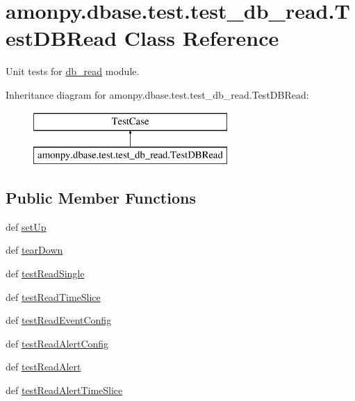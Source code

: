 \hypertarget{classamonpy_1_1dbase_1_1test_1_1test__db__read_1_1_test_d_b_read}{\section{amonpy.\-dbase.\-test.\-test\-\_\-db\-\_\-read.\-Test\-D\-B\-Read Class Reference}
\label{classamonpy_1_1dbase_1_1test_1_1test__db__read_1_1_test_d_b_read}
}


Unit tests for \hyperlink{namespaceamonpy_1_1dbase_1_1db__read}{db\-\_\-read} module.  


Inheritance diagram for amonpy.\-dbase.\-test.\-test\-\_\-db\-\_\-read.\-Test\-D\-B\-Read\-:\begin{figure}[H]
\begin{center}
\leavevmode
\includegraphics[height=2.000000cm]{df/d87/classamonpy_1_1dbase_1_1test_1_1test__db__read_1_1_test_d_b_read}
\end{center}
\end{figure}
\subsection*{Public Member Functions}
\begin{DoxyCompactItemize}
\item 
def \hyperlink{classamonpy_1_1dbase_1_1test_1_1test__db__read_1_1_test_d_b_read_a3d42ef1ed1ec53504c475d0db682fc1e}{set\-Up}
\item 
def \hyperlink{classamonpy_1_1dbase_1_1test_1_1test__db__read_1_1_test_d_b_read_a5e6de8d1c39f5c64ac66b5329d7803ba}{tear\-Down}
\item 
def \hyperlink{classamonpy_1_1dbase_1_1test_1_1test__db__read_1_1_test_d_b_read_a8eef1ba4193c4b630467e5cc4356e326}{test\-Read\-Single}
\item 
def \hyperlink{classamonpy_1_1dbase_1_1test_1_1test__db__read_1_1_test_d_b_read_af5b8a121cd312c79b9a96f14225895cd}{test\-Read\-Time\-Slice}
\item 
def \hyperlink{classamonpy_1_1dbase_1_1test_1_1test__db__read_1_1_test_d_b_read_ad58e247d7332ccd18c21296b68ef3944}{test\-Read\-Event\-Config}
\item 
def \hyperlink{classamonpy_1_1dbase_1_1test_1_1test__db__read_1_1_test_d_b_read_a88bf26659e5ad77f96e49347e527ea1c}{test\-Read\-Alert\-Config}
\item 
def \hyperlink{classamonpy_1_1dbase_1_1test_1_1test__db__read_1_1_test_d_b_read_a9e83f573f0f9825c75e585d2e6707283}{test\-Read\-Alert}
\item 
def \hyperlink{classamonpy_1_1dbase_1_1test_1_1test__db__read_1_1_test_d_b_read_a521e28d6ad16e03b0a6ad6cbfe06f725}{test\-Read\-Alert\-Time\-Slice}
\end{DoxyCompactItemize}
